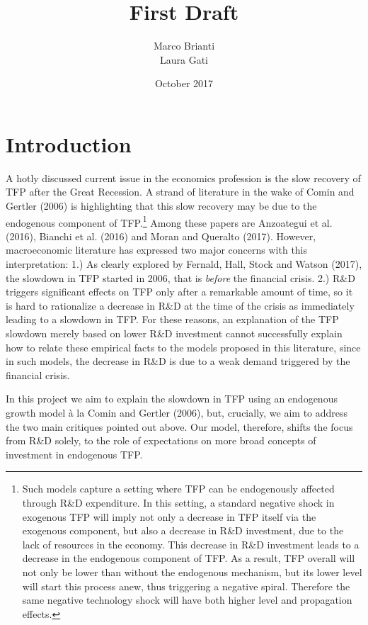 \documentclass{article}
\title{First Draft}
\author{Marco Brianti\\Laura Gati}
\date{October 2017}
\begin{document}
	
	\maketitle
	
	\tableofcontents
	
	\section{Introduction}
	
	A hotly discussed current issue in the economics profession is the slow recovery of TFP after the Great Recession. A strand of literature in the wake of Comin and Gertler (2006) is highlighting that this slow recovery may be due to the endogenous component of TFP.\footnote{Such models capture a setting where TFP can be endogenously affected through R\&D expenditure. In this setting, a standard negative shock in exogenous TFP will imply not only a decrease in TFP itself via the exogenous component, but also a decrease in R\&D investment, due to the lack of resources in the economy. This decrease in R\&D investment leads to a decrease in the endogenous component of TFP. As a result, TFP overall will not only be lower than without the endogenous mechanism, but its lower level will start this process anew, thus triggering a negative spiral. Therefore the same negative technology shock will have both higher level and propagation effects.} Among these papers are Anzoategui et al. (2016), Bianchi et al. (2016) and Moran and Queralto (2017). However,  macroeconomic literature has expressed two major concerns with this interpretation: 1.) As clearly explored by Fernald, Hall, Stock and Watson (2017), the slowdown in TFP started in 2006, that is \emph{before} the financial crisis. 2.) R\&D triggers significant effects on TFP only after a remarkable amount of time, so it is hard to rationalize a decrease in R\&D at the time of the crisis as immediately leading to a slowdown in TFP. For these reasons, an explanation of the TFP slowdown merely based on lower R\&D investment cannot successfully explain how to relate these empirical facts to the models proposed in this literature, since in such models, the decrease in R\&D is due to a weak demand triggered by the financial crisis.
	
	In this project we aim to explain the slowdown in TFP using an endogenous growth model \`a la Comin and Gertler (2006), but, crucially, we aim to address the two main critiques pointed out above. Our model, therefore, shifts the focus from R\&D solely, to the role of expectations on more broad concepts of investment in endogenous TFP.
	
\end{document}
